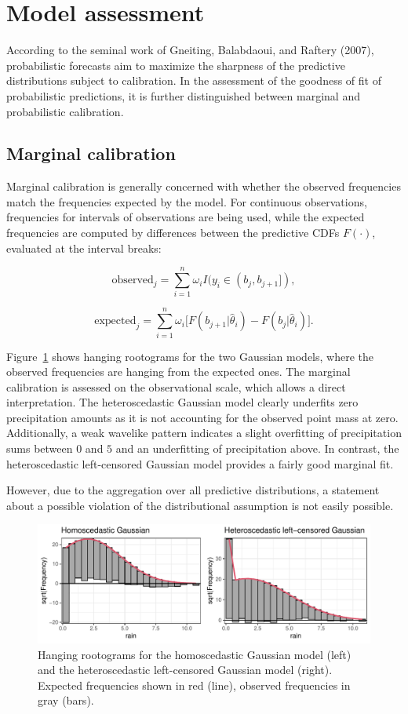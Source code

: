 \documentclass[twoside]{report}
\begin{document}
\section{Model assessment}

According to the seminal work of Gneiting, Balabdaoui, and Raftery (2007),
probabilistic forecasts aim to maximize the sharpness of the predictive
distributions subject to calibration. 
In the assessment of the goodness of fit of probabilistic predictions,
it is further distinguished between marginal and probabilistic calibration.

\subsection{Marginal calibration}


Marginal calibration is generally concerned with whether the observed
frequencies match the frequencies expected by the model.  For continuous
observations, frequencies for intervals of observations are being used, while
the expected frequencies are computed by differences between the predictive
CDFs $F(\cdot)$, evaluated at the interval breaks:


$$
\text{observed}_j = \sum_{i=1}^n \omega_i I(y_i \in (b_j, b_{j+1}]),
$$

$$
\text{expected}_j = \sum_{i=1}^n \omega_i \big[ F(b_{j+1} | \hat{\theta}_i) - F(b_{j} | \hat{\theta}_i) \big].
$$

Figure~\ref{stauffer:fig1} shows hanging rootograms for the two Gaussian
models, where the observed frequencies are hanging from the expected ones. The
marginal calibration is assessed on the observational scale, which allows a
direct interpretation.  The heteroscedastic Gaussian model clearly underfits
zero precipitation amounts as it is not accounting for the observed point mass
at zero. Additionally, a weak wavelike pattern indicates a slight overfitting
of precipitation sums between $0$ and $5$ and an underfitting of precipitation
above. In contrast, the heteroscedastic left-censored Gaussian model provides a
fairly good marginal fit.

However, due to the aggregation over all predictive distributions, a statement
about a possible violation of the distributional assumption is not easily possible.

\begin{figure}[!ht]\centering
    \includegraphics[width=\textwidth]{Stauffer-rootograms}
    \caption{\label{stauffer:fig1}
        Hanging rootograms for the homoscedastic Gaussian model (left)
        and the heteroscedastic left-censored Gaussian model (right).
        Expected frequencies shown in red (line), observed frequencies
        in gray (bars).
    }
\end{figure}
\end{document}
